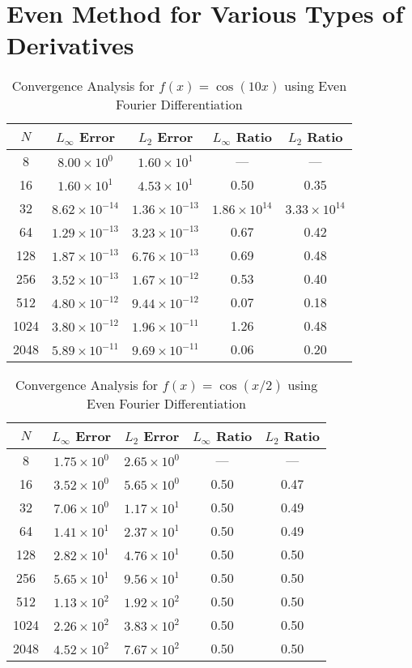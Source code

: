 \section{Even Method for Various Types of Derivatives}
\begin{table}[H]
\centering
\begin{tabular}{|c|c|c|c|c|}
\hline
$N$ & $L_\infty$ Error & $L_2$ Error & $L_\infty$ Ratio & $L_2$ Ratio \\
\hline
8 & $8.00 \times 10^{0}$ & $1.60 \times 10^{1}$ & --- & --- \\
16 & $1.60 \times 10^{1}$ & $4.53 \times 10^{1}$ & 0.50 & 0.35 \\
32 & $8.62 \times 10^{-14}$ & $1.36 \times 10^{-13}$ & $1.86 \times 10^{14}$ & $3.33 \times 10^{14}$ \\
64 & $1.29 \times 10^{-13}$ & $3.23 \times 10^{-13}$ & 0.67 & 0.42 \\
128 & $1.87 \times 10^{-13}$ & $6.76 \times 10^{-13}$ & 0.69 & 0.48 \\
256 & $3.52 \times 10^{-13}$ & $1.67 \times 10^{-12}$ & 0.53 & 0.40 \\
512 & $4.80 \times 10^{-12}$ & $9.44 \times 10^{-12}$ & 0.07 & 0.18 \\
1024 & $3.80 \times 10^{-12}$ & $1.96 \times 10^{-11}$ & 1.26 & 0.48 \\
2048 & $5.89 \times 10^{-11}$ & $9.69 \times 10^{-11}$ & 0.06 & 0.20 \\
\hline
\end{tabular}
\caption{Convergence Analysis for $f(x) = \cos(10x)$ using Even Fourier Differentiation}
\label{tab:cos10x}
\end{table}

\begin{table}[H]
\centering
\begin{tabular}{|c|c|c|c|c|}
\hline
$N$ & $L_\infty$ Error & $L_2$ Error & $L_\infty$ Ratio & $L_2$ Ratio \\
\hline
8 & $1.75 \times 10^{0}$ & $2.65 \times 10^{0}$ & --- & --- \\
16 & $3.52 \times 10^{0}$ & $5.65 \times 10^{0}$ & 0.50 & 0.47 \\
32 & $7.06 \times 10^{0}$ & $1.17 \times 10^{1}$ & 0.50 & 0.49 \\
64 & $1.41 \times 10^{1}$ & $2.37 \times 10^{1}$ & 0.50 & 0.49 \\
128 & $2.82 \times 10^{1}$ & $4.76 \times 10^{1}$ & 0.50 & 0.50 \\
256 & $5.65 \times 10^{1}$ & $9.56 \times 10^{1}$ & 0.50 & 0.50 \\
512 & $1.13 \times 10^{2}$ & $1.92 \times 10^{2}$ & 0.50 & 0.50 \\
1024 & $2.26 \times 10^{2}$ & $3.83 \times 10^{2}$ & 0.50 & 0.50 \\
2048 & $4.52 \times 10^{2}$ & $7.67 \times 10^{2}$ & 0.50 & 0.50 \\
\hline
\end{tabular}
\caption{Convergence Analysis for $f(x) = \cos(x/2)$ using Even Fourier Differentiation}
\label{tab:cosxhalf}
\end{table}

